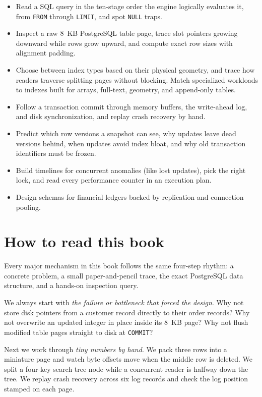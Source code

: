 \begin{itemize}
  \item Read a SQL query in the ten-stage order the engine logically evaluates it, from \texttt{FROM} through \texttt{LIMIT}, and spot \texttt{NULL} traps.
  \item Inspect a raw 8~KB PostgreSQL table page, trace slot pointers growing downward while rows grow upward, and compute exact row sizes with alignment padding.
  \item Choose between index types based on their physical geometry, and trace how readers traverse splitting pages without blocking. Match specialized workloads to indexes built for arrays, full-text, geometry, and append-only tables.
  \item Follow a transaction commit through memory buffers, the write-ahead log, and disk synchronization, and replay crash recovery by hand.
  \item Predict which row versions a snapshot can see, why updates leave dead versions behind, when updates avoid index bloat, and why old transaction identifiers must be frozen.
  \item Build timelines for concurrent anomalies (like lost updates), pick the right lock, and read every performance counter in an execution plan.
  \item Design schemas for financial ledgers backed by replication and connection pooling.
\end{itemize}

\section*{How to read this book}

Every major mechanism in this book follows the same four-step rhythm: a concrete problem, a small paper-and-pencil trace, the exact PostgreSQL data structure, and a hands-on inspection query.

We always start with \emph{the failure or bottleneck that forced the design}. Why not store disk pointers from a customer record directly to their order records? Why not overwrite an updated integer in place inside its 8~KB page? Why not flush modified table pages straight to disk at \texttt{COMMIT}?

Next we work through \emph{tiny numbers by hand}. We pack three rows into a miniature page and watch byte offsets move when the middle row is deleted. We split a four-key search tree node while a concurrent reader is halfway down the tree. We replay crash recovery across six log records and check the log position stamped on each page.

